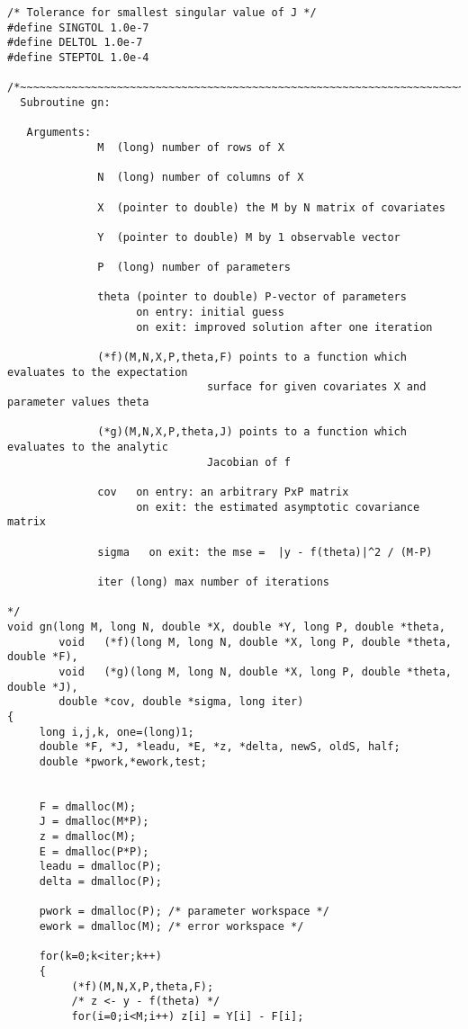 \documentclass{article}
\begin{document}
{\begin{verbatim}
/* Tolerance for smallest singular value of J */
#define SINGTOL 1.0e-7
#define DELTOL 1.0e-7 
#define STEPTOL 1.0e-4 

/*~~~~~~~~~~~~~~~~~~~~~~~~~~~~~~~~~~~~~~~~~~~~~~~~~~~~~~~~~~~~~~~~~~~~~~
  Subroutine gn:

   Arguments: 
              M  (long) number of rows of X

              N  (long) number of columns of X

              X  (pointer to double) the M by N matrix of covariates
              
              Y  (pointer to double) M by 1 observable vector

              P  (long) number of parameters
                 
              theta (pointer to double) P-vector of parameters
                    on entry: initial guess
                    on exit: improved solution after one iteration

              (*f)(M,N,X,P,theta,F) points to a function which evaluates to the expectation 
                               surface for given covariates X and parameter values theta

              (*g)(M,N,X,P,theta,J) points to a function which evaluates to the analytic 
                               Jacobian of f

              cov   on entry: an arbitrary PxP matrix
                    on exit: the estimated asymptotic covariance matrix

              sigma   on exit: the mse =  |y - f(theta)|^2 / (M-P)
              
              iter (long) max number of iterations
              
*/
void gn(long M, long N, double *X, double *Y, long P, double *theta,
        void   (*f)(long M, long N, double *X, long P, double *theta, double *F), 
        void   (*g)(long M, long N, double *X, long P, double *theta, double *J),
        double *cov, double *sigma, long iter)
{
     long i,j,k, one=(long)1;
     double *F, *J, *leadu, *E, *z, *delta, newS, oldS, half;
     double *pwork,*ework,test;
     
  
     F = dmalloc(M);
     J = dmalloc(M*P);
     z = dmalloc(M);
     E = dmalloc(P*P);  
     leadu = dmalloc(P);
     delta = dmalloc(P);

     pwork = dmalloc(P); /* parameter workspace */
     ework = dmalloc(M); /* error workspace */

     for(k=0;k<iter;k++)
     {
          (*f)(M,N,X,P,theta,F);
          /* z <- y - f(theta) */
          for(i=0;i<M;i++) z[i] = Y[i] - F[i];


\end{verbatim}}
\end{document}
